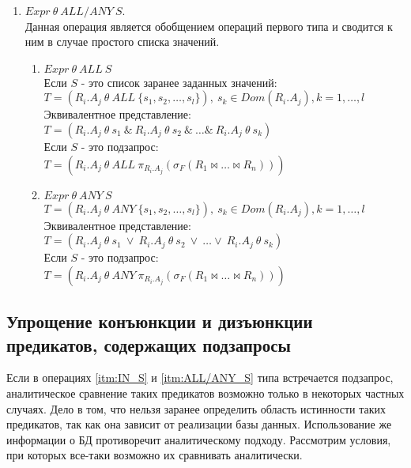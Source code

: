 \documentclass[10pt,a4paper]{article}
\def \n #1{\mathit{#1}}
\begin{document}
\begin{enumerate}
\item \label{itm:ALL/ANY_S} $\n{Expr}\ \theta\ \n{ALL/ANY}\ S$.\\
Данная операция является обобщением операций первого типа и сводится к ним в случае простого списка
значений.
\begin{enumerate}[label=\Roman*]
  \item $\n{Expr}\ \theta\ \n{ALL}\ S$\\ Если $S$ - это список заранее заданных значений:\\
  $T = (\n{R_i.A_j}\ \theta\ \n{ALL}\ \{s_1, s_2, \dots, s_l \}),\ s_k \in Dom(R_i.A_j), k = 1,
  \dots, l$\\  
  Эквивалентное представление:\\
  $T = (\n{R_i.A_j}\ \theta\ s_1\ \&\ \n{R_i.A_j}\ \theta\ s_2\ \&\ \dots \&\ \n{R_i.A_j}\ \theta\
  s_k)$\\
  Если $S$ - это подзапрос:\\
  $T = (\n{R_i.A_j}\ \theta\ \n{ALL}\ \pi_{R_i.A_j} (\sigma_F (R_1 \Join \dots \Join R_n)))$\\
  \item $\n{Expr}\ \theta\ \n{ANY}\ S$\\
  $T = (\n{R_i.A_j}\ \theta\ \n{ANY}\ \{s_1, s_2, \dots, s_l \}),\ s_k \in Dom(R_i.A_j), k = 1,
  \dots, l$\\  
  Эквивалентное представление:\\
  $T = (\n{R_i.A_j}\ \theta\ s_1\ \vee\ \n{R_i.A_j}\ \theta\ s_2\ \vee\ \dots \vee\ \n{R_i.A_j}\
  \theta\ s_k)$\\
  Если $S$ - это подзапрос:\\
  $T = (\n{R_i.A_j}\ \theta\ \n{ANY}\ \pi_{R_i.A_j} (\sigma_F (R_1 \Join \dots \Join R_n)))$\\
\end{enumerate}
\end{enumerate}

\subsection{Упрощение конъюнкции и дизъюнкции предикатов, содержащих подзапросы}
Если в операциях \ref{itm:IN_S} и \ref{itm:ALL/ANY_S} типа встречается подзапрос,
аналитическое сравнение таких предикатов возможно только в некоторых частных случаях. Дело в том,
что нельзя заранее определить область истинности таких предикатов, так как она зависит от реализации
базы данных. Использование же информации о БД противоречит аналитическому подходу. Рассмотрим
условия, при которых все-таки возможно их сравнивать аналитически.
\end{document}
